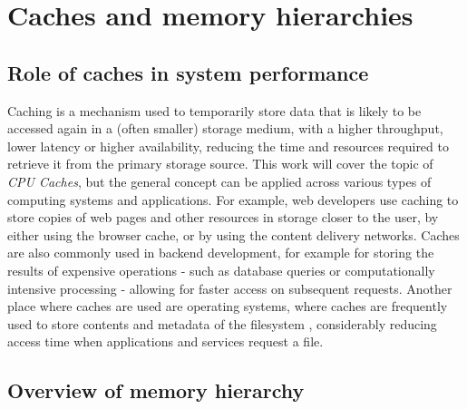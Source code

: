 \section{Caches and memory hierarchies}


\subsection{Role of caches in system performance}

Caching is a mechanism used to temporarily store data that is likely to be accessed again in a (often smaller) storage medium, with a higher throughput, lower latency or higher availability,
reducing the time and resources required to retrieve it from the primary storage source.
This work will cover the topic of \textit{CPU Caches}, but the general concept can be applied across
various types of computing systems and applications.
For example, web developers use caching to store copies of web pages and other resources in storage closer to the user, by either using the browser cache, or by using the content delivery networks. %
Caches are also commonly used in backend development, for example for storing the results of expensive operations - such as database queries or computationally intensive processing -
allowing for faster access on subsequent requests. Another place where caches are used are operating systems, where caches are frequently used to store contents and metadata of %
the filesystem \cite{linuxfscache}, considerably reducing access time when applications and services request a file.

\subsection{Overview of memory hierarchy} \label{sec:memhier}

